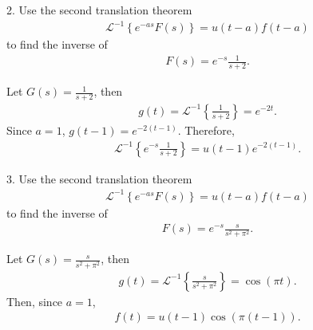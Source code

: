 \documentclass{report}
\begin{document}
    \bigbreak \noindent 
    \begin{mdframed}
        2. Use the second translation theorem
        \begin{align*}
            \mathcal{L}^{-1}\left\{e^{-as}F(s)\right\} = u(t-a)f(t-a)
        \end{align*}
        to find the inverse of 
        \begin{align*}
            F(s) = e^{-s}\frac{1}{s+2}
        .\end{align*}
    \end{mdframed}
    \bigbreak \noindent 
    Let $G(s) = \frac{1}{s+2}$, then
    \begin{align*}
        g(t) = \mathcal{L}^{-1}\left\{\frac{1}{s+2}\right\} = e^{-2t}
    .\end{align*}
    Since $a = 1$, $g(t-1) = e^{-2(t-1)}$. Therefore, 
    \begin{align*}
       \mathcal{L}^{-1}\left\{e^{-s}\frac{1}{s+2}\right\}  = u(t-1)e^{-2(t-1)}
    .\end{align*}

    \pagebreak 
    \begin{mdframed}
        3. Use the second translation theorem
        \begin{align*}
            \mathcal{L}^{-1}\left\{e^{-as}F(s)\right\} = u(t-a)f(t-a)
        \end{align*}
        to find the inverse of 
        \begin{align*}
            F(s) = e^{-s}\frac{s}{s^{2} + \pi^{2}}
        .\end{align*}
    \end{mdframed}
    \bigbreak \noindent 
    Let $G(s) = \frac{s}{s^{2}+\pi^{2}}$, then
    \begin{align*}
        g(t) = \mathcal{L}^{-1}\left\{\frac{s}{s^{2} + \pi^{2}}\right\} = \cos{\left(\pi t \right)}
    .\end{align*}
    Then, since $a = 1$, 
    \begin{align*}
        f(t) = u(t-1)\cos{\left(\pi(t-1)\right)}
    .\end{align*}
\end{document}
